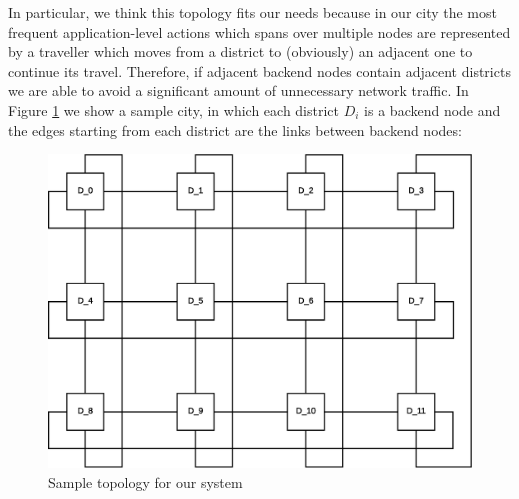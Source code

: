In particular, we think this topology fits our needs because in our city the
most frequent application-level actions which spans over multiple nodes are
represented by a traveller which moves from a district to (obviously) an
adjacent one to continue its travel.
Therefore, if adjacent backend nodes contain adjacent districts we are able to
avoid a significant amount of unnecessary network traffic. In Figure
\ref{fig:sd-sys-arch-topology} we show a sample city, in which each district
$D_i$ is a backend node and the edges starting from each district are the links
between backend nodes:

\begin{figure}[H]
  \centering
  \includegraphics[scale=0.5,keepaspectratio]
    {images/solution/topology.eps}
  \caption{Sample topology for our system}
  \label{fig:sd-sys-arch-topology}
\end{figure}
